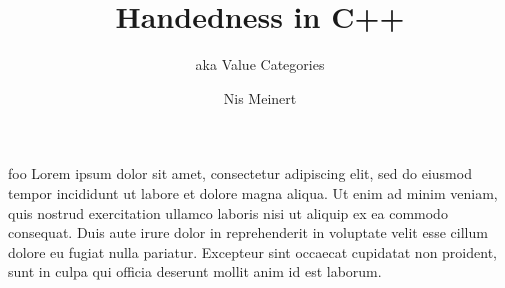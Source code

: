 \documentclass[compress,aspectratio=1610]{beamer}
\title{Handedness in C++}
\subtitle{aka Value Categories}
\institute{iCSC 2019}
\author{Nis Meinert}
\newcommand{\inputlisting}[1]{}
\begin{document}
\maketitle

\begin{frame}{foo}
    Lorem ipsum dolor sit amet, consectetur adipiscing elit, sed do eiusmod tempor incididunt ut labore et dolore magna aliqua. Ut enim ad minim veniam, quis nostrud exercitation ullamco laboris nisi ut aliquip ex ea commodo consequat. Duis aute irure dolor in reprehenderit in voluptate velit esse cillum dolore eu fugiat nulla pariatur. Excepteur sint occaecat cupidatat non proident, sunt in culpa qui officia deserunt mollit anim id est laborum.
\end{frame}

\begin{frame}[fragile]
    \begin{columns}[t]
        \begin{column}{.45\textwidth}
            \inputlisting{snippet1}
        \end{column}
        \begin{column}{.45\textwidth}
            Assembler}]{snippet1.asm}
        \end{column}
    \end{columns}
\end{frame}

\begin{frame}[fragile]
    \inputlisting{snippet2}
\end{frame}
\end{document}
